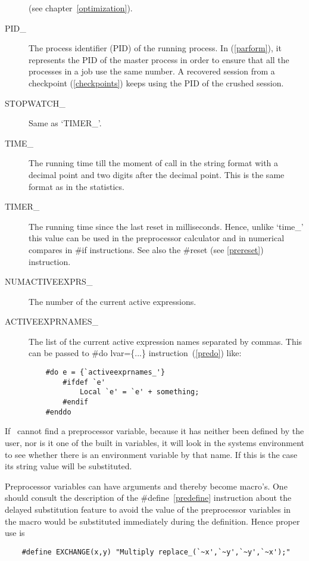\begin{description}
               (see chapter~\ref{optimization}).
\item[PID\_]         The process identifier (PID)   of
               the running process. In \ParFORM{} (\ref{parform}), it represents
               the PID of the master process in order to ensure that all the
               processes in a job use the same number. A recovered session from
               a checkpoint (\ref{checkpoints}) keeps using the PID of the
               crushed session.
\item[STOPWATCH\_] Same as `TIMER\_'.
\item[TIME\_]  The running time till the moment of call in the string format
               with a decimal point and two digits after the decimal point. 
               This is the same format as in the statistics.
\item[TIMER\_] The running time since the last reset in milliseconds. Hence, 
               unlike `time\_' this value can be used in the preprocessor 
               calculator and in numerical compares in \#if instructions.
               See also the \#reset (see \ref{prereset}) instruction.
\item[NUMACTIVEEXPRS\_]  The number of the current active expressions.
\item[ACTIVEEXPRNAMES\_]  The list of the current active expression names 
               separated by commas. This can be passed to \#do lvar=\{...\} 
               instruction~(\ref{predo}) like: 
\begin{verbatim}
    #do e = {`activeexprnames_'}
        #ifdef `e'
            Local `e' = `e' + something;
        #endif
    #enddo
\end{verbatim}
\end{description}

\noindent If \FORM\ cannot find a preprocessor variable, because it has 
neither been defined by the user, nor is it one of the built in variables, 
it will look in the systems environment to see whether 
there is an environment variable by that name. If this is the case its 
string value will be substituted.

\noindent Preprocessor variables can have arguments and thereby become 
macro's. One should consult the description of the \#define~\ref{predefine} 
instruction about the delayed substitution feature to avoid the value of 
the preprocessor variables in the macro would be substituted immediately 
during the definition. Hence proper use is
\begin{verbatim}
    #define EXCHANGE(x,y) "Multiply replace_(`~x',`~y',`~y',`~x');"
\end{verbatim}


